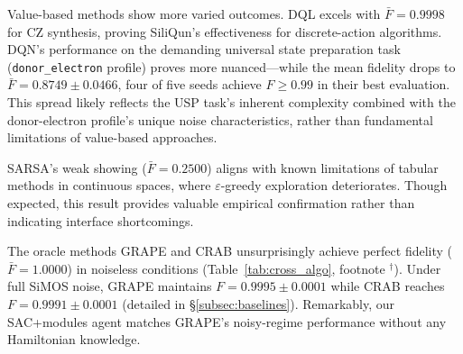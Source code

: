 Value-based methods show more varied outcomes. DQL excels with $\bar{F} = 0.9998$ for CZ synthesis, proving SiliQun's effectiveness for discrete-action algorithms. DQN's performance on the demanding universal state preparation task (\texttt{donor\_electron} profile) proves more nuanced—while the mean fidelity drops to $\bar{F} = 0.8749 \pm 0.0466$, four of five seeds achieve $F \geq 0.99$ in their best evaluation. This spread likely reflects the USP task's inherent complexity combined with the donor-electron profile's unique noise characteristics, rather than fundamental limitations of value-based approaches.

SARSA's weak showing ($\bar{F} = 0.2500$) aligns with known limitations of tabular methods in continuous spaces, where $\varepsilon$-greedy exploration deteriorates. Though expected, this result provides valuable empirical confirmation rather than indicating interface shortcomings.

The oracle methods GRAPE and CRAB unsurprisingly achieve perfect fidelity ($\bar{F} = 1.0000$) in noiseless conditions (Table~\ref{tab:cross_algo}, footnote $^\dagger$). Under full SiMOS noise, GRAPE maintains $F = 0.9995 \pm 0.0001$ while CRAB reaches $F = 0.9991 \pm 0.0001$ (detailed in \S\ref{subsec:baselines}). Remarkably, our SAC+modules agent matches GRAPE's noisy-regime performance without any Hamiltonian knowledge.

